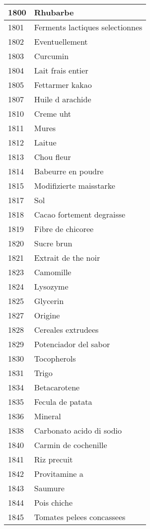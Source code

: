 \begin{longtable}{|l|l|}
1800 & Rhubarbe \\ \hline 
1801 & Ferments lactiques selectionnes \\ \hline 
1802 & Eventuellement \\ \hline 
1803 & Curcumin \\ \hline 
1804 & Lait frais entier \\ \hline 
1805 & Fettarmer kakao \\ \hline 
1807 & Huile d arachide \\ \hline 
1810 & Creme uht \\ \hline 
1811 & Mures \\ \hline 
1812 & Laitue \\ \hline 
1813 & Chou fleur \\ \hline 
1814 & Babeurre en poudre \\ \hline 
1815 & Modifizierte maisstarke \\ \hline 
1817 & Sol \\ \hline 
1818 & Cacao fortement degraisse \\ \hline 
1819 & Fibre de chicoree \\ \hline 
1820 & Sucre brun \\ \hline 
1821 & Extrait de the noir \\ \hline 
1823 & Camomille \\ \hline 
1824 & Lysozyme \\ \hline 
1825 & Glycerin \\ \hline 
1827 & Origine \\ \hline 
1828 & Cereales extrudees \\ \hline 
1829 & Potenciador del sabor \\ \hline 
1830 & Tocopherols \\ \hline 
1831 & Trigo \\ \hline 
1834 & Betacarotene \\ \hline 
1835 & Fecula de patata \\ \hline 
1836 & Mineral \\ \hline 
1838 & Carbonato acido di sodio \\ \hline 
1840 & Carmin de cochenille \\ \hline 
1841 & Riz precuit \\ \hline 
1842 & Provitamine a \\ \hline 
1843 & Saumure \\ \hline 
1844 & Pois chiche \\ \hline 
1845 & Tomates pelees concassees \\ \hline 

\end{longtable}
